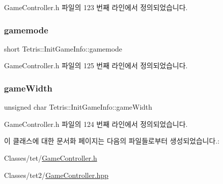 Game\+Controller.\+h 파일의 123 번째 라인에서 정의되었습니다.

\mbox{\label{class_tetris_1_1_init_game_info_a5d4655981462fd53da508dfba0d2e99c}} 
\subsubsection{\texorpdfstring{gamemode}{gamemode}}
{\footnotesize\ttfamily short Tetris\+::\+Init\+Game\+Info\+::gamemode}



Game\+Controller.\+h 파일의 125 번째 라인에서 정의되었습니다.

\mbox{\label{class_tetris_1_1_init_game_info_a035e9d0d8d8b92436b2683627ca51059}} 
\subsubsection{\texorpdfstring{game\+Width}{gameWidth}}
{\footnotesize\ttfamily unsigned char Tetris\+::\+Init\+Game\+Info\+::game\+Width}



Game\+Controller.\+h 파일의 124 번째 라인에서 정의되었습니다.



이 클래스에 대한 문서화 페이지는 다음의 파일들로부터 생성되었습니다.\+:\begin{DoxyCompactItemize}
\item 
Classes/tet/\hyperlink{_game_controller_8h}{Game\+Controller.\+h}\item 
Classes/tet2/\hyperlink{_game_controller_8hpp}{Game\+Controller.\+hpp}\end{DoxyCompactItemize}
